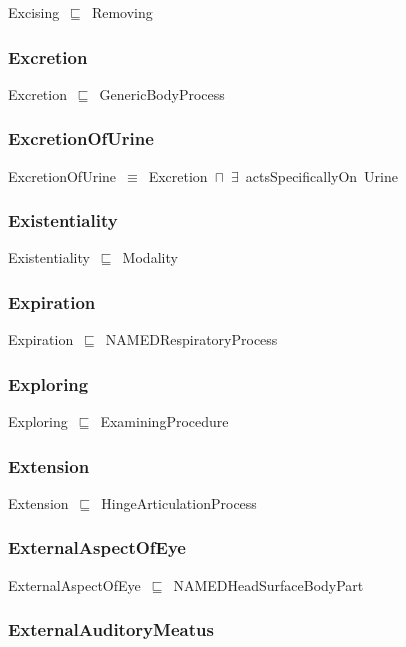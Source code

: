 \documentclass{article}
\begin{document}
Excising~\ensuremath{\sqsubseteq}~Removing~

\subsubsection*{Excretion}

Excretion~\ensuremath{\sqsubseteq}~GenericBodyProcess~

\subsubsection*{ExcretionOfUrine}

ExcretionOfUrine~\ensuremath{\equiv}~Excretion~\ensuremath{\sqcap}~\ensuremath{\exists}~actsSpecificallyOn~Urine

\subsubsection*{Existentiality}

Existentiality~\ensuremath{\sqsubseteq}~Modality~

\subsubsection*{Expiration}

Expiration~\ensuremath{\sqsubseteq}~NAMEDRespiratoryProcess~

\subsubsection*{Exploring}

Exploring~\ensuremath{\sqsubseteq}~ExaminingProcedure~

\subsubsection*{Extension}

Extension~\ensuremath{\sqsubseteq}~HingeArticulationProcess~

\subsubsection*{ExternalAspectOfEye}

ExternalAspectOfEye~\ensuremath{\sqsubseteq}~NAMEDHeadSurfaceBodyPart~

\subsubsection*{ExternalAuditoryMeatus}
\end{document}
